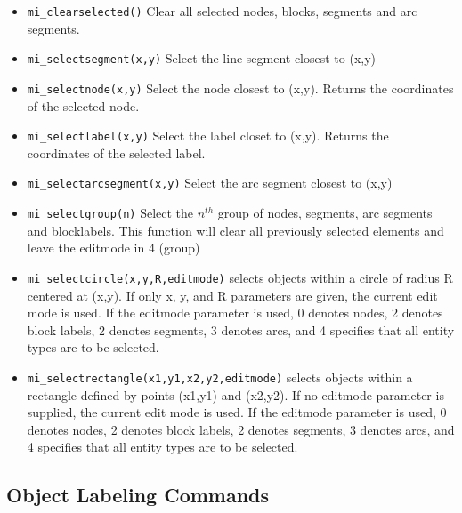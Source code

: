 \begin{itemize}
\item{\tt mi\_clearselected()} Clear all selected nodes, blocks, segments
and arc segments.

\item{\tt mi\_selectsegment(x,y)} Select the line segment closest to
(x,y)

\item{\tt mi\_selectnode(x,y)} Select the node closest to (x,y).
Returns the coordinates of the selected node.

\item{\tt mi\_selectlabel(x,y)} Select the label closet to (x,y).
Returns the coordinates of the selected label.

\item{\tt mi\_selectarcsegment(x,y)} Select the arc segment closest to
(x,y)

\item{\tt mi\_selectgroup(n)} Select the $n^{th}$ group of nodes, segments, arc
segments and blocklabels. This function will clear all previously selected
elements and leave the editmode in 4 (group)

\item{\tt mi\_selectcircle(x,y,R,editmode)} selects objects within a circle of radius
R centered at (x,y).  If only x, y, and R parameters are given, the current
edit mode is used.  If the editmode parameter is used, 0 denotes nodes, 2
denotes block labels, 2 denotes segments, 3 denotes arcs, and 4 specifies
that all entity types are to be selected.

\item{\tt mi\_selectrectangle(x1,y1,x2,y2,editmode)} selects objects within a rectangle
defined by points (x1,y1) and (x2,y2). If no editmode parameter is supplied,
the current edit mode is used.  If the editmode parameter is used, 0 denotes
nodes, 2 denotes block labels, 2 denotes segments, 3 denotes arcs, and 4 
specifies that all entity types are to be selected.

\end{itemize}

\subsection{Object Labeling Commands}

